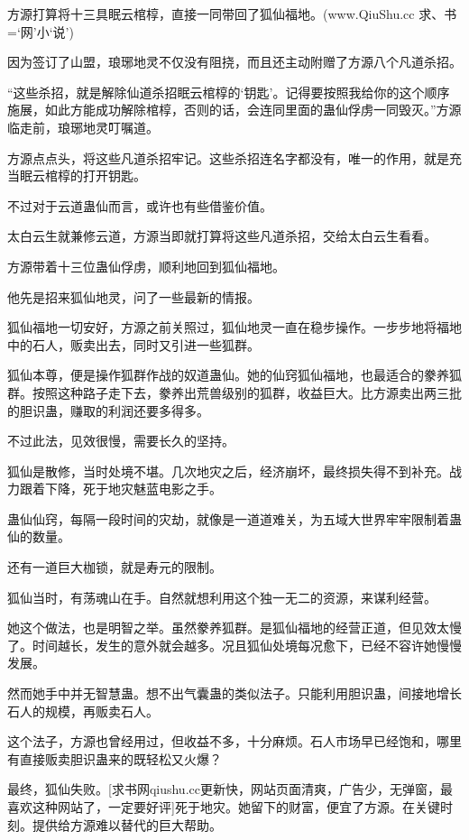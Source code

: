 
\begin{this_body}

方源打算将十三具眠云棺椁，直接一同带回了狐仙福地。(www.QiuShu.cc 求、书=‘网’小‘说’)

因为签订了山盟，琅琊地灵不仅没有阻挠，而且还主动附赠了方源八个凡道杀招。

“这些杀招，就是解除仙道杀招眠云棺椁的‘钥匙’。记得要按照我给你的这个顺序施展，如此方能成功解除棺椁，否则的话，会连同里面的蛊仙俘虏一同毁灭。”方源临走前，琅琊地灵叮嘱道。

方源点点头，将这些凡道杀招牢记。这些杀招连名字都没有，唯一的作用，就是充当眠云棺椁的打开钥匙。

不过对于云道蛊仙而言，或许也有些借鉴价值。

太白云生就兼修云道，方源当即就打算将这些凡道杀招，交给太白云生看看。

方源带着十三位蛊仙俘虏，顺利地回到狐仙福地。

他先是招来狐仙地灵，问了一些最新的情报。

狐仙福地一切安好，方源之前关照过，狐仙地灵一直在稳步操作。一步步地将福地中的石人，贩卖出去，同时又引进一些狐群。

狐仙本尊，便是操作狐群作战的奴道蛊仙。她的仙窍狐仙福地，也最适合的豢养狐群。按照这种路子走下去，豢养出荒兽级别的狐群，收益巨大。比方源卖出两三批的胆识蛊，赚取的利润还要多得多。

不过此法，见效很慢，需要长久的坚持。

狐仙是散修，当时处境不堪。几次地灾之后，经济崩坏，最终损失得不到补充。战力跟着下降，死于地灾魅蓝电影之手。

蛊仙仙窍，每隔一段时间的灾劫，就像是一道道难关，为五域大世界牢牢限制着蛊仙的数量。

还有一道巨大枷锁，就是寿元的限制。

狐仙当时，有荡魂山在手。自然就想利用这个独一无二的资源，来谋利经营。

她这个做法，也是明智之举。虽然豢养狐群。是狐仙福地的经营正道，但见效太慢了。时间越长，发生的意外就会越多。况且狐仙处境每况愈下，已经不容许她慢慢发展。

然而她手中并无智慧蛊。想不出气囊蛊的类似法子。只能利用胆识蛊，间接地增长石人的规模，再贩卖石人。

这个法子，方源也曾经用过，但收益不多，十分麻烦。石人市场早已经饱和，哪里有直接贩卖胆识蛊来的既轻松又火爆？

最终，狐仙失败。[求书网qiushu.cc更新快，网站页面清爽，广告少，无弹窗，最喜欢这种网站了，一定要好评]死于地灾。她留下的财富，便宜了方源。在关键时刻。提供给方源难以替代的巨大帮助。


\end{this_body}
